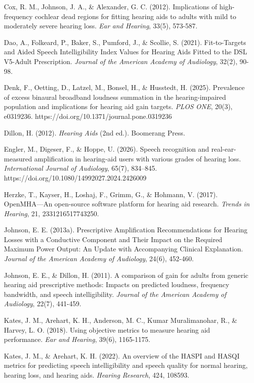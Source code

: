 \documentclass[
  12pt,
]{article}
\begin{document}
Cox, R. M., Johnson, J. A., \& Alexander, G. C. (2012). Implications of
high-frequency cochlear dead regions for fitting hearing aids to adults
with mild to moderately severe hearing loss. \emph{Ear and Hearing},
33(5), 573-587.

Dao, A., Folkeard, P., Baker, S., Pumford, J., \& Scollie, S. (2021).
Fit-to-Targets and Aided Speech Intelligibility Index Values for Hearing
Aids Fitted to the DSL V5-Adult Prescription. \emph{Journal of the
American Academy of Audiology}, 32(2), 90-98.

Denk, F., Oetting, D., Latzel, M., Bonsel, H., \& Husstedt, H. (2025).
Prevalence of excess binaural broadband loudness summation in the
hearing-impaired population and implications for hearing aid gain
targets. \emph{PLOS ONE}, 20(3), e0319236.
https://doi.org/10.1371/journal.pone.0319236

Dillon, H. (2012). \emph{Hearing Aids} (2nd ed.). Boomerang Press.

Engler, M., Digeser, F., \& Hoppe, U. (2026). Speech recognition and
real-ear-measured amplification in hearing-aid users with various grades
of hearing loss. \emph{International Journal of Audiology}, 65(7),
834--845. https://doi.org/10.1080/14992027.2024.2426009

Herzke, T., Kayser, H., Loshaj, F., Grimm, G., \& Hohmann, V. (2017).
OpenMHA---An open-source software platform for hearing aid research.
\emph{Trends in Hearing}, 21, 2331216517743250.

Johnson, E. E. (2013a). Prescriptive Amplification Recommendations for
Hearing Losses with a Conductive Component and Their Impact on the
Required Maximum Power Output: An Update with Accompanying Clinical
Explanation. \emph{Journal of the American Academy of Audiology}, 24(6),
452-460.

Johnson, E. E., \& Dillon, H. (2011). A comparison of gain for adults
from generic hearing aid prescriptive methods: Impacts on predicted
loudness, frequency bandwidth, and speech intelligibility. \emph{Journal
of the American Academy of Audiology}, 22(7), 441-459.

Kates, J. M., Arehart, K. H., Anderson, M. C., Kumar Muralimanohar, R.,
\& Harvey, L. O. (2018). Using objective metrics to measure hearing aid
performance. \emph{Ear and Hearing}, 39(6), 1165-1175.

Kates, J. M., \& Arehart, K. H. (2022). An overview of the HASPI and
HASQI metrics for predicting speech intelligibility and speech quality
for normal hearing, hearing loss, and hearing aids. \emph{Hearing
Research}, 424, 108593.
\end{document}
